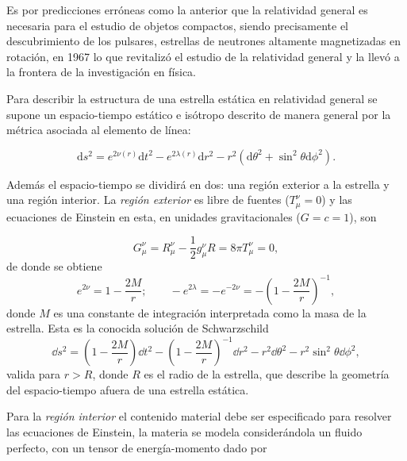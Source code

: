 Es por predicciones erróneas como la anterior que la relatividad general es necesaria para el estudio de objetos compactos, siendo precisamente el descubrimiento de los pulsares, estrellas de neutrones altamente magnetizadas en rotación, en 1967 \cite{Hewish1968ObservationSource} lo que revitalizó el estudio de la relatividad general y la llevó a la frontera de la investigación en física.

Para describir la estructura de una estrella estática en relatividad general se supone un espacio-tiempo estático e isótropo descrito de manera general por la métrica asociada al elemento de línea:

\begin{equation}
\mathrm { d } s ^ { 2 } = e ^ { 2 \nu ( r ) } \mathrm { d } t ^ { 2 } - e ^ { 2 \lambda ( r ) } \mathrm { d } r ^ { 2 } - r ^ { 2 } \left( \mathrm { d } \theta ^ { 2 } + \sin ^ { 2 }  \theta  \mathrm { d } \phi ^ { 2 } \right) .   
\end{equation}

Además el espacio-tiempo se dividirá en dos: una región exterior a la estrella y una región interior. 
La \textit{región exterior} es libre de fuentes ($T _ { \mu } ^ { \nu }=0$) y las ecuaciones de Einstein en esta, en unidades gravitacionales ($G=c=1$), son 

\begin{equation}
    G _ { \mu } ^ { \nu } = R _ { \mu } ^ { \nu } - \frac { 1 } { 2 } g _ { \mu } ^ { \nu } R = 8 \pi T _ { \mu } ^ { \nu }=0,
\end{equation}
de donde se obtiene
\begin{equation}
    e ^ { 2 \nu } = 1 - \frac { 2 M } { r };\quad \quad - e ^ { 2 \lambda } = - e ^ { - 2 \nu } = - \left( 1 - \frac { 2 M } { r } \right) ^ { - 1 },
\end{equation}
donde $M$ es una constante de integración interpretada como la masa de la estrella. Esta es la conocida solución de Schwarzschild
\begin{equation}
    \dd s ^ { 2 } =  \left( 1 - \frac { 2 M } { r } \right) \dd t ^ { 2 } - \left( 1 - \frac { 2 M } { r } \right) ^ { - 1 } \dd r ^ { 2 }  - r ^ { 2 } \dd \theta ^ { 2 } - r ^ { 2 } \sin ^ { 2 } \theta \dd \phi ^ { 2 }, 
\end{equation}
valida para $r>R$, donde $R$ es el radio de la estrella, que describe la geometría del espacio-tiempo afuera de una estrella estática.

Para la \textit{región interior} el contenido material debe ser especificado para resolver las ecuaciones de Einstein, la materia se modela considerándola un fluido perfecto, con un tensor de energía-momento dado por

